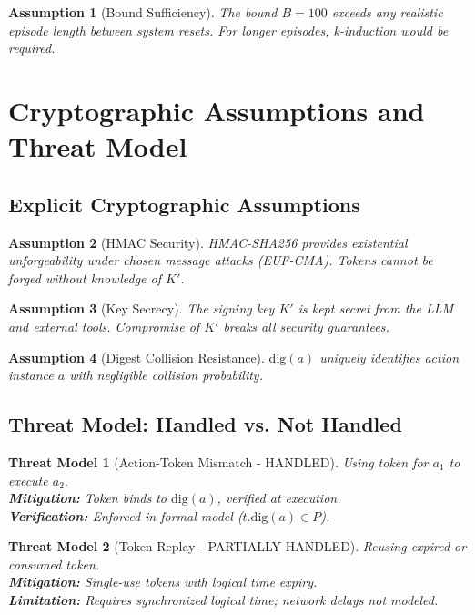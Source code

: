 \documentclass[12pt]{article}
\newtheorem{threat}{Threat Model}[section]
\newtheorem{assumption}{Assumption}[section]
\begin{document}
\begin{assumption}[Bound Sufficiency]
The bound $B=100$ exceeds any realistic episode length between system resets. For longer episodes, k-induction would be required.
\end{assumption}

\section{Cryptographic Assumptions and Threat Model}

\subsection{Explicit Cryptographic Assumptions}

\begin{assumption}[HMAC Security]
HMAC-SHA256 provides existential unforgeability under chosen message attacks (EUF-CMA). Tokens cannot be forged without knowledge of $K'$.
\end{assumption}

\begin{assumption}[Key Secrecy]
The signing key $K'$ is kept secret from the LLM and external tools. Compromise of $K'$ breaks all security guarantees.
\end{assumption}

\begin{assumption}[Digest Collision Resistance]
$\mathrm{dig}(a)$ uniquely identifies action instance $a$ with negligible collision probability.
\end{assumption}

\subsection{Threat Model: Handled vs. Not Handled}

\begin{threat}[Action-Token Mismatch - HANDLED]
Using token for $a_1$ to execute $a_2$.\\
\textbf{Mitigation:} Token binds to $\mathrm{dig}(a)$, verified at execution.\\
\textbf{Verification:} Enforced in formal model ($t.\mathrm{dig}(a) \in P$).
\end{threat}

\begin{threat}[Token Replay - PARTIALLY HANDLED]
Reusing expired or consumed token.\\
\textbf{Mitigation:} Single-use tokens with logical time expiry.\\
\textbf{Limitation:} Requires synchronized logical time; network delays not modeled.
\end{threat}
\end{document}
